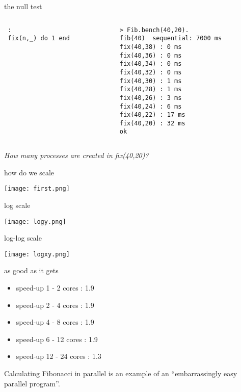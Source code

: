 \begin{frame}[fragile]{the null test}

\begin{columns}
\begin{column}{0.5\linewidth}
\begin{verbatim}
 :
 fix(n,_) do 1 end
\end{verbatim}
\end{column}
\pause
\begin{column}{0.5\linewidth}
\begin{verbatim}
> Fib.bench(40,20).
fib(40)  sequential: 7000 ms
fix(40,38) : 0 ms
fix(40,36) : 0 ms
fix(40,34) : 0 ms
fix(40,32) : 0 ms
fix(40,30) : 1 ms
fix(40,28) : 1 ms
fix(40,26) : 3 ms
fix(40,24) : 6 ms
fix(40,22) : 17 ms
fix(40,20) : 32 ms
ok
\end{verbatim}
\end{column}
\end{columns}

\pause\vspace{20pt} 
{\em How many processes are created in fix(40,20)?}

\end{frame}

\begin{frame}{how do we scale}

\texttt{[image: first.png]}

\end{frame}

\begin{frame}{log scale}

\texttt{[image: logy.png]}

\end{frame}

\begin{frame}{log-log scale}
 
\texttt{[image: logxy.png]}

\end{frame}

\begin{frame}{as good as it gets}

\begin{itemize}
  \item speed-up 1 - 2 cores : 1.9 %
  \item speed-up 2 - 4 cores : 1.9 %
  \item speed-up 4 - 8 cores : 1.9 %
  \item speed-up 6 - 12 cores : 1.9 %
\pause
  \item speed-up 12 - 24 cores : 1.3 %
\end{itemize}

\pause\vspace{20pt}

Calculating Fibonacci in parallel is an example of an ``embarrassingly
easy parallel program''.

\end{frame}

